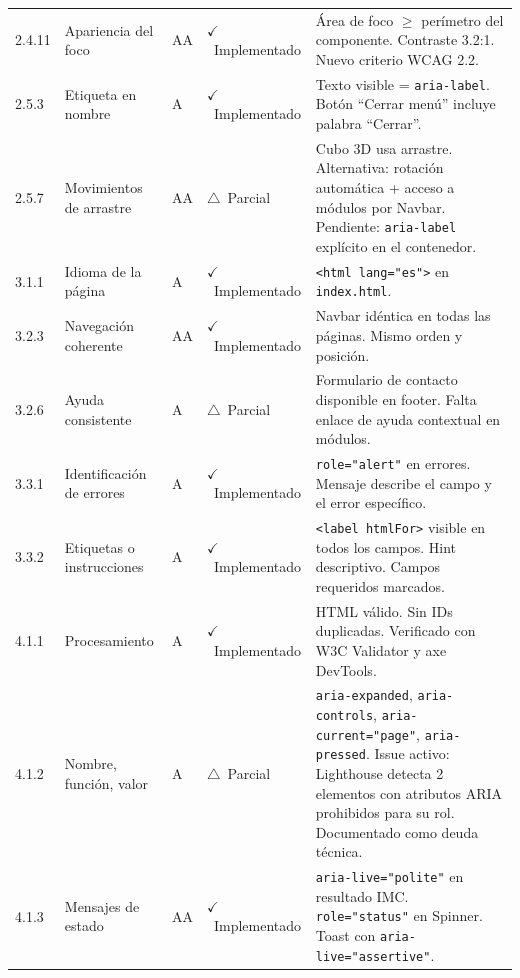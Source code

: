 \documentclass[12pt, a4paper]{article}
\newcommand{\cmark}{\textcolor{successgreen}{$\checkmark$}}
\newcommand{\wmark}{\textcolor{warningyellow}{$\triangle$}}
\begin{document}
\begin{longtable}{@{}>{\ttfamily\small}p{1.2cm} p{3.2cm} >{\centering\arraybackslash}p{0.9cm} >{\centering\arraybackslash\small}p{2.5cm} p{5.5cm}@{}}
2.4.11 & Apariencia del foco & AA & \textcolor{successgreen}{\cmark~Implementado} & Área de foco $\geq$ perímetro del componente. Contraste 3.2:1. Nuevo criterio WCAG 2.2. \\

2.5.3 & Etiqueta en nombre & A & \textcolor{successgreen}{\cmark~Implementado} & Texto visible = \texttt{aria-label}. Botón ``Cerrar menú'' incluye palabra ``Cerrar''. \\

2.5.7 & Movimientos de arrastre & AA & \textcolor{warningyellow}{\wmark~Parcial} & Cubo 3D usa arrastre. Alternativa: rotación automática + acceso a módulos por Navbar. Pendiente: \texttt{aria-label} explícito en el contenedor. \\

3.1.1 & Idioma de la página & A & \textcolor{successgreen}{\cmark~Implementado} & \texttt{<html lang="es">} en \texttt{index.html}. \\

3.2.3 & Navegación coherente & AA & \textcolor{successgreen}{\cmark~Implementado} & Navbar idéntica en todas las páginas. Mismo orden y posición. \\

3.2.6 & Ayuda consistente & A & \textcolor{warningyellow}{\wmark~Parcial} & Formulario de contacto disponible en footer. Falta enlace de ayuda contextual en módulos. \\

3.3.1 & Identificación de errores & A & \textcolor{successgreen}{\cmark~Implementado} & \texttt{role="alert"} en errores. Mensaje describe el campo y el error específico. \\

3.3.2 & Etiquetas o instrucciones & A & \textcolor{successgreen}{\cmark~Implementado} & \texttt{<label htmlFor>} visible en todos los campos. Hint descriptivo. Campos requeridos marcados. \\

4.1.1 & Procesamiento & A & \textcolor{successgreen}{\cmark~Implementado} & HTML válido. Sin IDs duplicadas. Verificado con W3C Validator y axe DevTools. \\

4.1.2 & Nombre, función, valor & A & \textcolor{warningyellow}{\wmark~Parcial} & \texttt{aria-expanded}, \texttt{aria-controls}, \texttt{aria-current="page"}, \texttt{aria-pressed}. Issue activo: Lighthouse detecta 2 elementos con atributos ARIA prohibidos para su rol. Documentado como deuda técnica. \\

4.1.3 & Mensajes de estado & AA & \textcolor{successgreen}{\cmark~Implementado} & \texttt{aria-live="polite"} en resultado IMC. \texttt{role="status"} en Spinner. Toast con \texttt{aria-live="assertive"}. \\

\end{longtable}
\end{document}
